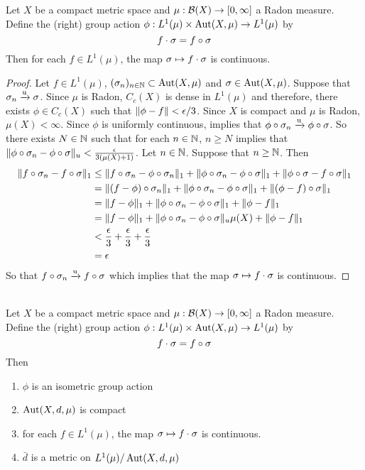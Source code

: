 \documentclass{book}
\begin{document}
	\begin{ex} \lex{}
	Let $X$ be a compact metric space and $\mu:\mathcal{B}(X) \rightarrow [0,\infty]$ a Radon measure. Define the (right) group action $\phi: L^1(\mu) \times \operatorname{Aut}(X, \mu) \rightarrow L^1(\mu) $ by 
	$$f \cdot \sigma = f \circ \sigma$$	
	Then for each $f \in L^1(\mu)$, the map $\sigma \mapsto  f \cdot \sigma$ is continuous.  
	\end{ex}
	
	\begin{proof}
	Let $f \in L^1(\mu)$, $(\sigma_n)_{n \in \mathbb{N}} \subset \operatorname{Aut}(X, \mu)$ and $\sigma \in \operatorname{Aut}(X, \mu)$. Suppose that $\sigma_n \xrightarrow{\text{u}} \sigma$. Since $\mu$ is Radon, $C_c(X)$ is dense in $L^1(\mu)$ and therefore, there exists $\phi \in C_c(X)$ such that $\|\phi - f\| < \epsilon/3$. Since $X$ is compact and $\mu$ is Radon, $\mu(X) < \infty$. Since $\phi$ is uniformly continuous,  implies that $\phi \circ \sigma_n \xrightarrow{\text{u}} \phi \circ \sigma$.  So there exists $N \in \mathbb{N}$ such that for each $n \in \mathbb{N}$, $n \geq N$ implies that $\|\phi \circ \sigma_n - \phi \circ \sigma\|_u < \frac{\epsilon}{3 (\mu(X)+1)}$. Let $n \in \mathbb{N}$. Suppose that $n \geq \mathbb{N}$. Then 
	\begin{align*}
	\|f \circ \sigma_n - f \circ \sigma\|_1 
	&\leq \|f \circ \sigma_n - \phi \circ \sigma_n \|_1 + \|\phi \circ \sigma_n - \phi \circ \sigma\|_1 + \|\phi \circ \sigma - f \circ \sigma\|_1 \\
	& = \|(f - \phi) \circ \sigma_n \|_1 + \|\phi \circ \sigma_n - \phi \circ \sigma\|_1 + \|(\phi - f) \circ \sigma\|_1 \\
	&= \|f - \phi  \|_1 + \|\phi \circ \sigma_n - \phi \circ \sigma\|_1 + \|\phi - f \|_1 \\
	&= \|f - \phi  \|_1 + \|\phi \circ \sigma_n - \phi \circ \sigma\|_u \mu(X) + \|\phi - f \|_1 \\
	&< \frac{\epsilon}{3} + \frac{\epsilon}{3} + \frac{\epsilon}{3} \\
	&= \epsilon
	\end{align*}
	So that $f \circ \sigma_n \xrightarrow{\text{u}} f \circ \sigma$ which implies that the map $\sigma \mapsto  f \cdot \sigma$ is continuous. 
	\end{proof}
	
	\begin{ex} \lex{}  \\
	Let $X$ be a compact metric space and $\mu:\mathcal{B}(X) \rightarrow [0,\infty]$ a Radon measure. Define the (right) group action $\phi: L^1(\mu) \times \operatorname{Aut}(X, \mu) \rightarrow L^1(\mu) $ by 
	$$f \cdot \sigma = f \circ \sigma$$	
	Then 
	\begin{enumerate}
	\item $\phi$ is an isometric group action 
	\item $\operatorname{Aut}(X, d, \mu)$ is compact 
	\item for each $f \in L^1(\mu)$, the map $\sigma \mapsto  f \cdot \sigma$ is continuous.  
	\item $\bar{d}$ is a metric on $L^1(\mu) / \operatorname{Aut}(X, d, \mu)$
	\end{enumerate}
	\end{ex}
	
\end{document}
